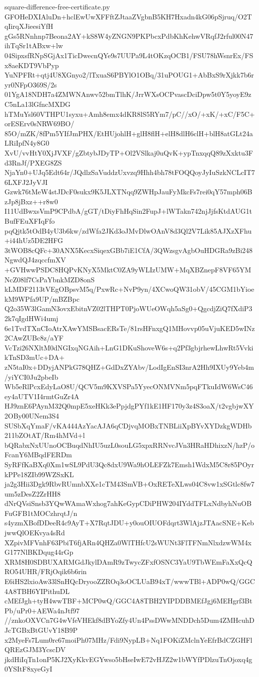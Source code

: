 \documentclass[11pt]{article}
\theoremstyle{definition}
\theoremstyle{remark}
\begin{document}
\begin{filecontents*}[overwrite]{square-difference-free-certificate.py}
GFOHeDXIAluDn+hclEwUwXFFftZJtaaZVgbnB5KH7Hxadn4kG06pSjruq/O2TqIirqXJieesiYfH
gGs5RNnhnp7Beona2AY+kS8W4yZNGN9PKPbcxPdbKhKehwVRqfJ2rful00N47ihTqSr1tABxw+lw
04SipxsfRNpSGjAx1TicDwecnQYe9s7UUPa9L4tOKzqOCB1/FSU78hWsnrEx/FSx8aeKDT9VbPyp
YuNPFRt+qtj4U8XGnyo2/lTxuaS6PBYlO1OBq/31uPOUG1+AbBxS9rXjkk7b6ryr0NFpO369S/2s
01YgA18NDH7a4ZMWNAnwv52bmTlhK/JrrWXsOCPvascDciDpw5t0Y5yoyE9zC5nLa13lGfncMXDG
hTMuYsl60VTHPU1syxu+Amh8emx4dKR8lS5RYm7/pC//xO/+xK/+xC/F5C+orESErv0sNRW69BO/
85O/mZK/8fPm5YIfJmPHX/EtHUjohlH+glH8flH+elH8dlH6clH+blH8atGLt24aLRiIpfN4y8G0
XvU/vvHtY0XjJVXF/gZbtybJDyTP+Ol2VSlkaj0uQvK+ypTnxqqQ89zXxktu3Fd3RnJf/PXEG8ZS
NjaYn0+UJq5Edt64r/JQdlzSaVuddzUxvzq9Hhh4bh78tFOQQoyJyIuSzkNCLcIT76LXFJ2JyVJI
Gzwk76tMeW4stJDcF0sukx9K5JLXTNqq9ZWHpJauFyMkcFs7rei0qY57mph06BzJp8jBxz++r8w0
I11UdBwxsVmP9CPdbA/gGT/tDiyFhHqSin2FupJ+lWTakn742njJjfsKtdAUG1tBufFEuXFIqFfo
pqQjtk5tOdB4yU3b6kw/zdWfa2JKd3oJMvDlwOAnV8d3Ql2V7Lik85AJXzXFhu+i44hUz5DE2HFG
3tWOB8cQFc+30ANX5KecxSiqexGBb7iE1CfA/3QWzsgvAgbOuHDGRa9zBi248NgwdQJ4zqccfmXV
+GVHwwPSDC8HQPvKNyX5MktC0ZA9yWLIzUMW+MqXBZnepF8VF65YMNcZ08lf7CsPaYbnkMZD8onS
kLMDF2113tVEgOBpsvM5q/PxwRc+NvP9yn/4XCwoQW31obV/45CGM1bYioekM9WPfa9UP/mBZBpc
Q2o35W3lGamN3ovxEbitnVZ02lTHPT0PjoWUeOWqh5aSg0+QgcdjZiQ7fXdiP32k7qIgdHWi4umj
6e1TvdTXnCIoAtrXAwYMSBsacERsTe/81rsHFnxgQ1MHovvp05uVjuKED5wINz2CAwZUBc8z/aYF
VcTzi26NXltM0dNGIxqNGAih+LnG1DKuShoveW6s+q2Pf3gbjrhewLhwRt5VvkikTnSD3mUc+DA+
zN5taI0x+DDyjANPkG78QHZ+GdDxZYAbv/LodIgEnSI3nrA2Hh9IXUy9Yeb4m/yiYCI0Ju2pbeIb
Wb5eRlPcxEdyLaO8U/QCV5m9KXVSPa5YyecONMVNm5pqFTkuIdW6WsC46ey4aUTV1I4rmtGuZr4A
HJ9znE6PAynM32Q0mpE5xeHKk3ePpjdgPYf1kE1HF170y3z4S3oaX/t2vgbjwXY2OBy00UNem3S4
SUSbXqYmaF/vKA444AzYacAJA6qCDjvqMOBxTNBLiiXpBYvXYDzkgWDHb211bZOtAT/Rm4hMVd+l
bQRabxNxUUnoOCBuqdNhIU5uzL0souLG5xpxRRNvcJVn3HRaHDhixzN/hzP/oFcanY6MBqdFERDm
SyRFfKaBXq0Xm1wSL9PdU3Qc8dxU9Wa9hOLEFZk7Emsh1WdxM5C8r85POyrkPPe18ZIb99WZSxKL
ja2g3Hii3Dgk9RbvRUmnbXXe1cTM43SmVB+OxRETeXLws04C8vw1xSGtlc8fw7um5zDesZ2ZrHH8
dNrQVsiSnsb3YQwWAmaWxhog7ahKeGypCDiPHW204IYddTFLxNdbyhNuOBFuGFB1tMOCzhrqtJ/n
s4yzmXBofDDeeR4c9AyT+X7RqtJDU+y0ouOIUOFdqrt3WlAjzJTAacSNE+KebjwwQlOEKvya4sRd
XZpivMFVnhF63PbiT6fjARn4QHZa0WlTHfcU2sWUNt3FlTFNmNlxdzwWM4xG177NlBKDqug44rGp
XRM8H0SDBUXARMGdJkylDAmR9zTwycZFxfOSNC3YaU9TbWEmFaXxQcQRO54UHR/FRjOqik6b6rin
E6iHS2lxioAw33lSnHQcDryooZZROq3oOCLUaB94xT/wwwTBl+ADP0wQ/GGC4A8TBH6YIPithuDL
cMEfJgh+tyH4wwTBF+MCP0wQ/GGC4A8TBH2YIPDDBMEfJgj6MEHgrf3BtPb/uPr0+AEWa4nJtf97
//znkoOXVCn7G4wVfeVHEkf8dBYoZfy4Un4PssDWwMNDDch5Dum4ZMHcuhDJcTGBxBtGUvY18B9P
x2MyeFs7Lum0rc67moiPh07MHz/Fdi9NypLB+Nq1FOKiZMclnYeEfrBdCZGHFlQREzGJM3YcscDV
jkdHiIqTn1onP5KJ2XyKkvEGYwso5bHseIwE72vHJZ2w1bWYfPDlzuTnOjoxq4g0YSItF8xyeGyI

\end{filecontents*}
\end{document}
